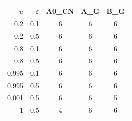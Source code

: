 \begin{tabular}{rrccc}
\toprule
$u$ & $\varepsilon$ & A0\_CN & A\_G & B\_G \\
\midrule
0.2 & 0.1 & 6 & 6 & 6 \\
0.2 & 0.5 & 6 & 6 & 6 \\
0.8 & 0.1 & 6 & 6 & 6 \\
0.8 & 0.5 & 6 & 6 & 6 \\
0.995 & 0.1 & 6 & 6 & 6 \\
0.995 & 0.5 & 6 & 6 & 6 \\
0.001 & 0.5 & 6 & 6 & 5 \\
1 & 0.5 & 4 & 6 & 6 \\
\bottomrule
\end{tabular}
